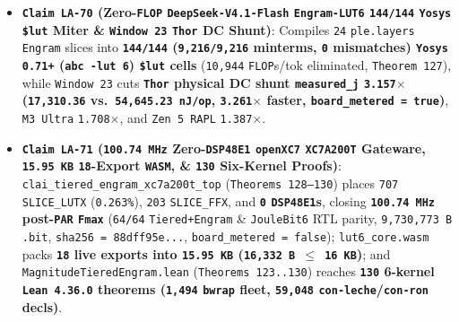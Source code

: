 \documentclass[10pt]{article}
\begin{document}
\begin{itemize}
  \item \textbf{\texttt{Claim LA-70} (Zero-\texttt{FLOP} \texttt{DeepSeek-V4.1-Flash} \texttt{Engram-LUT6} \texttt{144/144} \texttt{Yosys} \texttt{\$lut} Miter \& \texttt{Window 23} \texttt{Thor} DC Shunt)}: Compiles \texttt{24} \texttt{ple.layers} \texttt{Engram} slices into \textbf{\texttt{144/144} (\texttt{9,216/9,216} minterms, \texttt{0} mismatches) \texttt{Yosys 0.71+} (\texttt{abc -lut 6}) \texttt{\$lut} cells} (\texttt{10,944} \texttt{FLOP}s/tok eliminated, \texttt{Theorem 127}), while \texttt{Window 23} cuts \textbf{\texttt{Thor} physical DC shunt \texttt{measured\_j} \texttt{3.157$\times$} (\texttt{17,310.36} vs.\ \texttt{54,645.23 nJ/op}, \texttt{3.261$\times$} faster, \texttt{board\_metered = true})}, \texttt{M3 Ultra} \texttt{1.708$\times$}, and \texttt{Zen 5 RAPL} \texttt{1.387$\times$}.
  \item \textbf{\texttt{Claim LA-71} (\texttt{100.74 MHz} Zero-\texttt{DSP48E1} \texttt{openXC7} \texttt{XC7A200T} Gateware, \texttt{15.95 KB} \texttt{18}-Export \texttt{WASM}, \& \texttt{130} Six-Kernel Proofs)}: \texttt{clai\_tiered\_engram\_xc7a200t\_top} (\texttt{Theorems 128--130}) places \texttt{707} \texttt{SLICE\_LUTX} (\texttt{0.263\%}), \texttt{203} \texttt{SLICE\_FFX}, and \textbf{\texttt{0} \texttt{DSP48E1}s}, closing \textbf{\texttt{100.74 MHz} post-\texttt{PAR} \texttt{Fmax}} (\texttt{64/64} \texttt{Tiered+Engram} \& \texttt{JouleBit6} RTL parity, \texttt{9,730,773 B} \texttt{.bit}, \texttt{sha256 = 88dff95e...}, \texttt{board\_metered = false}); \texttt{lut6\_core.wasm} packs \textbf{\texttt{18} live exports into \texttt{15.95 KB} (\texttt{16,332 B $\le$ 16 KB})}; and \texttt{MagnitudeTieredEngram.lean} (\texttt{Theorems 123..130}) reaches \textbf{\texttt{130} 6-kernel \texttt{Lean 4.36.0} theorems (\texttt{1,494} \texttt{bwrap} fleet, \texttt{59,048} \texttt{con-leche}/\texttt{con-ron} decls)}.
\end{itemize}
\end{document}
